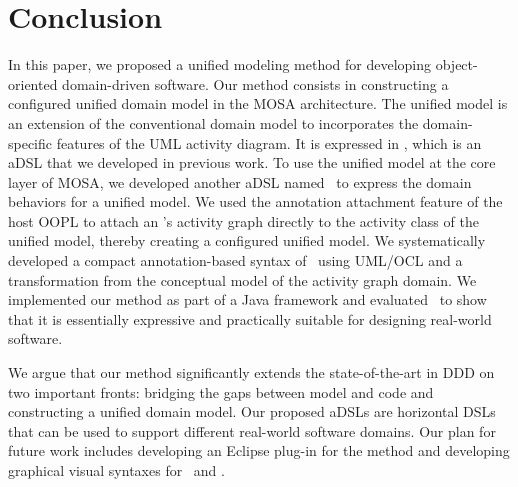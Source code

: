 %
\section{Conclusion}\label{sect:conclusion} %
In this paper, we proposed a unified modeling method for developing object-oriented domain-driven software. Our method consists in constructing a configured unified domain model in the MOSA architecture. The unified model is an extension of the conventional domain model to incorporates the domain-specific features of the UML activity diagram. It is expressed in \dcsl, which is an aDSL that we developed in previous work. To use the unified model at the core layer of MOSA, we developed another aDSL named \agl~to express the domain behaviors for a unified model. We used the annotation attachment feature of the host OOPL to attach an \agl's activity graph directly to the activity class of the unified model, thereby creating a configured unified model.
We systematically developed a compact annotation-based syntax of \agl~using UML/OCL and a transformation from the conceptual model of the activity graph domain.
%
We implemented our method as part of a Java framework and evaluated \agl~to show that it is essentially expressive and practically suitable for designing real-world software. 

We argue that our method significantly extends the state-of-the-art in DDD on two important fronts: bridging the gaps between model and code and constructing a unified domain model. Our proposed aDSLs are horizontal DSLs that can be used to support different real-world software domains.
%
Our plan for future work includes
developing an Eclipse plug-in for the method and developing graphical visual syntaxes for \dcsl~and \agl.

